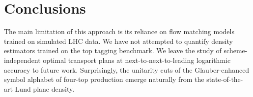 \section{Conclusions}\label{sec:conclusions}

The main limitation of this approach is its reliance on flow matching
models trained on simulated LHC data. We have not attempted to quantify
density estimators trained on the top tagging benchmark. We leave the
study of scheme-independent optimal transport plans at
next-to-next-to-leading logarithmic accuracy to future work.
Surprisingly, the unitarity cuts of the Glauber-enhanced symbol alphabet
of four-top production emerge naturally from the state-of-the-art Lund
plane density.

